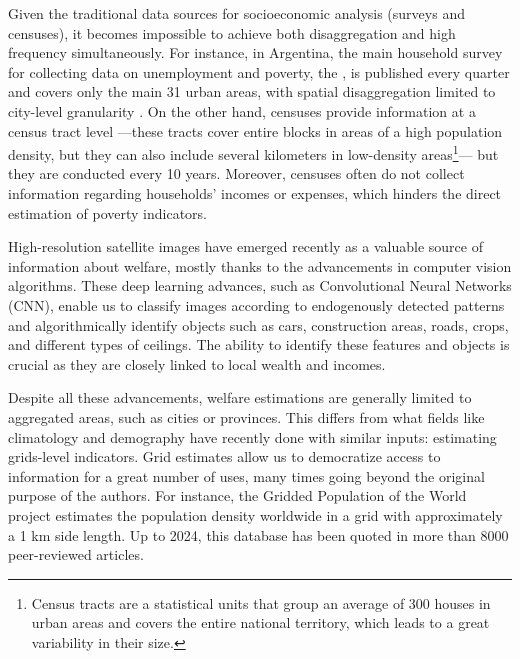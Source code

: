 \documentclass[conference]{IEEEtran}
\begin{document}
Given the traditional data sources for socioeconomic analysis (surveys and censuses), it becomes impossible to achieve both disaggregation and high frequency simultaneously. For instance, in Argentina, the main household survey for collecting data on unemployment and poverty, the , is published every quarter and covers only the main 31 urban areas, with spatial disaggregation limited to city-level granularity \citep{nuevaeph}. On the other hand, censuses provide information at a census tract level –--these tracts cover entire blocks in areas of a high population density, but they can also include several kilometers in low-density areas\footnote{Census tracts are a statistical units that group an average of 300 houses in urban areas and covers the entire national territory, which leads to a great variability in their size.}--- but they are conducted every 10 years. Moreover, censuses often do not collect information regarding households' incomes or expenses, which hinders the direct estimation of poverty indicators.

High-resolution satellite images have emerged recently as a valuable source of information about welfare, mostly thanks to the advancements in computer vision algorithms. These deep learning advances, such as Convolutional Neural Networks (CNN), enable us to classify images according to endogenously detected patterns and algorithmically identify objects such as cars, construction areas, roads, crops, and different types of ceilings. The ability to identify these features and objects is crucial as they are closely linked to local wealth and incomes.

Despite all these advancements, welfare estimations are generally limited to aggregated areas, such as cities or provinces. This differs from what fields like climatology and demography have recently done with similar inputs: estimating grids-level indicators. Grid estimates allow us to democratize access to information for a great number of uses, many times going beyond the original purpose of the authors. For instance, the Gridded Population of the World project \citep{Gridpop} estimates the population density worldwide in a grid with approximately a 1 km side length. Up to 2024, this database has been quoted in more than 8000 peer-reviewed articles.
\end{document}
